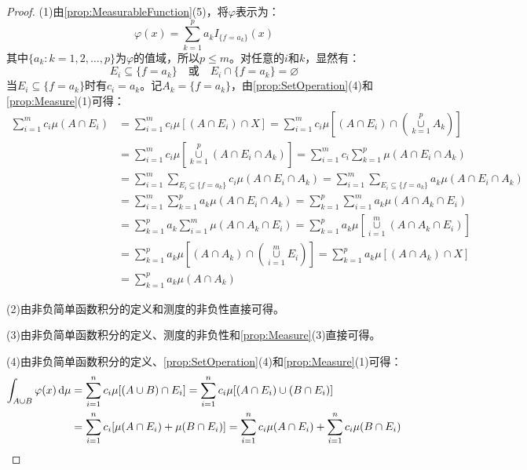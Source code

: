 \begin{proof}
	(1)由\cref{prop:MeasurableFunction}(5)，将$\varphi$表示为：
	\begin{equation*}
		\varphi(x)=\sum_{k=1}^{p}a_kI_{\{f=a_k\}}(x)
	\end{equation*}
	其中$\{a_k:k=1,2,\dots,p\}$为$\varphi$的值域，所以$p\leqslant m$。对任意的$i$和$k$，显然有：
	\begin{equation*}
		E_i\subseteq\{f=a_k\}\quad\text{或}\quad E_i\cap\{f=a_k\}=\varnothing
	\end{equation*}
	当$E_i\subseteq\{f=a_k\}$时有$c_i=a_k$。记$A_k=\{f=a_k\}$，由\cref{prop:SetOperation}(4)和\cref{prop:Measure}(1)可得：
	\begin{align*}
		\sum_{i=1}^{m}c_i\mu(A\cap E_i)
		&=\sum_{i=1}^{m}c_i\mu[(A\cap E_i)\cap X]
		=\sum_{i=1}^{m}c_i\mu\left[(A\cap E_i)\cap\left(\underset{k=1}{\overset{p}{\cup}}A_k\right)\right] \\
		&=\sum_{i=1}^{m}c_i\mu\left[\underset{k=1}{\overset{p}{\cup}}(A\cap E_i\cap A_k)\right]
		=\sum_{i=1}^{m}c_i\sum_{k=1}^{p}\mu(A\cap E_i\cap A_k) \\
		&=\sum_{i=1}^{m}\sum_{E_i\subseteq\{f=a_k\}}^{}c_i\mu(A\cap E_i\cap A_k)
		=\sum_{i=1}^{m}\sum_{E_i\subseteq\{f=a_k\}}^{}a_k\mu(A\cap E_i\cap A_k) \\
		&=\sum_{i=1}^{m}\sum_{k=1}^{p}a_k\mu(A\cap E_i\cap A_k)
		=\sum_{k=1}^{p}\sum_{i=1}^{m}a_k\mu(A\cap A_k\cap E_i) \\
		&=\sum_{k=1}^{p}a_k\sum_{i=1}^{m}\mu(A\cap A_k\cap E_i)
		=\sum_{k=1}^{p}a_k\mu\left[\underset{i=1}{\overset{m}{\cup}}(A\cap A_k\cap E_i)\right] \\
		&=\sum_{k=1}^{p}a_k\mu\left[(A\cap A_k)\cap\left(\underset{i=1}{\overset{m}{\cup}}E_i\right)\right]
		=\sum_{k=1}^{p}a_k\mu[(A\cap A_k)\cap X] \\
		&=\sum_{k=1}^{p}a_k\mu(A\cap A_k)
	\end{align*}\par
	(2)由非负简单函数积分的定义和测度的非负性直接可得。\par
	(3)由非负简单函数积分的定义、测度的非负性和\cref{prop:Measure}(3)直接可得。\par
	(4)由非负简单函数积分的定义、\cref{prop:SetOperation}(4)和\cref{prop:Measure}(1)可得：
	\begin{align*}
		\int_{A\cup B}\varphi(x)\dif\mu
		&=\sum_{i=1}^{n}c_i\mu[(A\cup B)\cap E_i]
		=\sum_{i=1}^{n}c_i\mu[(A\cap E_i)\cup(B\cap E_i)] \\
		&=\sum_{i=1}^{n}c_i[\mu(A\cap E_i)+\mu(B\cap E_i)]
		=\sum_{i=1}^{n}c_i\mu(A\cap E_i)+\sum_{i=1}^{n}c_i\mu(B\cap E_i) \\

\end{align*}
\end{proof}
